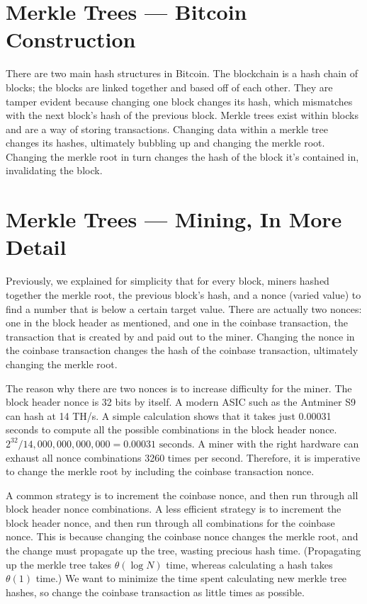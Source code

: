 \documentclass[full.tex]{subfiles}
\begin{document}
 \section*{Merkle Trees --- Bitcoin Construction}
 
 There are two main hash structures in Bitcoin. The blockchain is a hash chain of blocks; the blocks are linked together and based off of each other. They are tamper evident because changing one block changes its hash, which mismatches with the next block's hash of the previous block. Merkle trees exist within blocks and are a way of storing transactions. Changing data within a merkle tree changes its hashes, ultimately bubbling up and changing the merkle root. Changing the merkle root in turn changes the hash of the block it's contained in, invalidating the block.
 
 \section*{Merkle Trees --- Mining, In More Detail}
 
 Previously, we explained for simplicity that for every block, miners hashed together the merkle root, the previous block's hash, and a nonce (varied value) to find a number that is below a certain target value. There are actually two nonces: one in the block header as mentioned, and one in the coinbase transaction, the transaction that is created by and paid out to the miner. Changing the nonce in the coinbase transaction changes the hash of the coinbase transaction, ultimately changing the merkle root.
 
 The reason why there are two nonces is to increase difficulty for the miner. The block header nonce is 32 bits by itself. A modern ASIC such as the Antminer S9 can hash at 14 TH/s. A simple calculation shows that it takes just 0.00031 seconds to compute all the possible combinations in the block header nonce. $2^{32} / 14,000,000,000,000 = 0.00031 \text{~seconds}$. A miner with the right hardware can exhaust all nonce combinations 3260 times per second. Therefore, it is imperative to change the merkle root by including the coinbase transaction nonce.
 
 A common strategy is to increment the coinbase nonce, and then run through all block header nonce combinations. A less efficient strategy is to increment the block header nonce, and then run through all combinations for the coinbase nonce. This is because changing the coinbase nonce changes the merkle root, and the change must propagate up the tree, wasting precious hash time. (Propagating up the merkle tree takes $\theta(\log N)$ time, whereas calculating a hash takes $\theta(1)$ time.) We want to minimize the time spent calculating new merkle tree hashes, so change the coinbase transaction as little times as possible.
 
\end{document}
